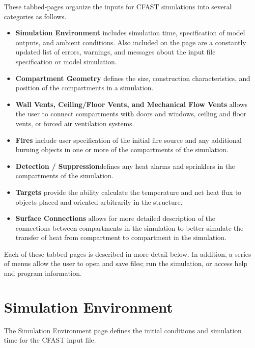 These tabbed-pages organize the inputs for CFAST simulations into several categories as follows.
\begin{itemize}
\item \textbf{Simulation Environment} includes simulation time, specification of model outputs, and ambient conditions. Also included on the page are a constantly updated list of errors, warnings, and messages about the input file specification or model simulation.
\item \textbf{Compartment Geometry} defines the size, construction characteristics, and position of the compartments in a simulation.
\item \textbf{Wall Vents, Ceiling/Floor Vents, and Mechanical Flow Vents} allows the user to connect compartments with doors and windows, ceiling and floor vents, or forced air ventilation systems.
\item \textbf{Fires} include user specification of the initial fire source and any additional burning objects in one or more of the compartments of the simulation.
\item \textbf{Detection / Suppression}defines any heat alarms and sprinklers in the compartments of the simulation.
\item \textbf{Targets} provide the ability calculate the temperature and net heat flux to objects placed and oriented arbitrarily in the structure.
\item \textbf{Surface Connections} allows for more detailed description of the connections between compartments in the simulation to better simulate the transfer of heat from compartment to compartment in the simulation.
\end{itemize}

Each of these tabbed-pages is described in more detail below. In addition, a series of menus allow the user to open and save files; run the simulation, or access help and program information.

\newpage
\section{Simulation Environment}

The Simulation Environment page defines the initial conditions and simulation time for the CFAST input file. 

